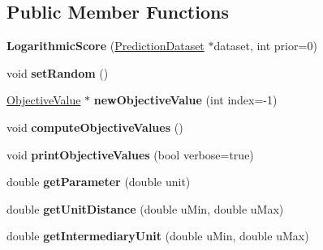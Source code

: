 \subsection*{Public Member Functions}
\begin{DoxyCompactItemize}
\item 
\hypertarget{classLogarithmicScore_a4fba67dfac53087dbfde7cb825501c97}{{\bfseries Logarithmic\-Score} (\hyperlink{classPredictionDataset}{Prediction\-Dataset} $\ast$dataset, int prior=0)}\label{classLogarithmicScore_a4fba67dfac53087dbfde7cb825501c97}

\item 
\hypertarget{classLogarithmicScore_a7e3c601e96541b3156b02d84ce6b754e}{void {\bfseries set\-Random} ()}\label{classLogarithmicScore_a7e3c601e96541b3156b02d84ce6b754e}

\item 
\hypertarget{classLogarithmicScore_ab64011283bff491364cdffb0420dc89b}{\hyperlink{classObjectiveValue}{Objective\-Value} $\ast$ {\bfseries new\-Objective\-Value} (int index=-\/1)}\label{classLogarithmicScore_ab64011283bff491364cdffb0420dc89b}

\item 
\hypertarget{classLogarithmicScore_ac0a5eb6f03d9afd66a05aded42e6647f}{void {\bfseries compute\-Objective\-Values} ()}\label{classLogarithmicScore_ac0a5eb6f03d9afd66a05aded42e6647f}

\item 
\hypertarget{classLogarithmicScore_add0be2f6175a2aa0ef5e20026f9eb2be}{void {\bfseries print\-Objective\-Values} (bool verbose=true)}\label{classLogarithmicScore_add0be2f6175a2aa0ef5e20026f9eb2be}

\item 
\hypertarget{classLogarithmicScore_a33390a7d2b8a14ef7f2e6300a22a4c0b}{double {\bfseries get\-Parameter} (double unit)}\label{classLogarithmicScore_a33390a7d2b8a14ef7f2e6300a22a4c0b}

\item 
\hypertarget{classLogarithmicScore_a123c27f97bfa6071da1f51f39b897bcb}{double {\bfseries get\-Unit\-Distance} (double u\-Min, double u\-Max)}\label{classLogarithmicScore_a123c27f97bfa6071da1f51f39b897bcb}

\item 
\hypertarget{classLogarithmicScore_a40576f47008aa6ab69d95535c0a5fa79}{double {\bfseries get\-Intermediary\-Unit} (double u\-Min, double u\-Max)}\label{classLogarithmicScore_a40576f47008aa6ab69d95535c0a5fa79}

\end{DoxyCompactItemize}
